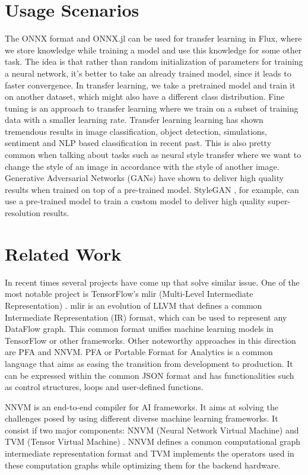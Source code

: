 \documentclass{juliacon}
\begin{document}
\section{Usage Scenarios}
The ONNX format and ONNX.jl can be used for transfer learning in Flux, where we store knowledge while training a model and
use this knowledge for some other task. The idea is that rather than random initialization of parameters for training a neural network, it's better to take an already trained model, since
it leads to faster convergence. In transfer learning, we take a pretrained model and train it on another 
dataset, which might also have a different class distribution. Fine tuning is an approach to transfer learning
where we train on a subset of training data with a smaller learning rate. Transfer learning learning has shown
tremendous results in image classification, object detection, simulations, sentiment and NLP based classification 
in recent past.    
This is also pretty common when talking about tasks such as neural style transfer where we want to change the 
style of an image in accordance with the style of another image. Generative Adversarial Networks (GANs) have shown
to deliver high quality results when trained on top of a pre-trained model. StyleGAN \cite{DBLP:journals/corr/abs-1812-04948} , for example, can use a
pre-trained model to train a custom model to deliver high quality super-resolution results.

\section{Related Work}

In recent times several projects have come up that solve similar issue. One of the most notable project is
TensorFlow's mlir (Multi-Level Intermediate Representation) \cite{lattner2020mlir} . mlir is an evolution of LLVM 
\cite{LLVM:CGO04} that defines a 
common Intermediate Representation (IR) format, which can be used to represent any DataFlow graph. This common 
format unifies machine learning models in TensorFlow or other frameworks.  
Other noteworthy approaches in this direction are PFA and NNVM. PFA \cite{10.1145/2939672.2939731} or Portable Format for Analytics is a common
language that aims as easing the transition from development to production. It can be expressed within
the common JSON format and has functionalities such as control structures, loops and user-defined functions.
  
NNVM\cite{nnvm} is an end-to-end compiler for AI frameworks. It aims at solving the challenges posed by using different
diverse machine learning frameworks. It consist if two major components: NNVM (Neural Network Virtual Machine)
and TVM (Tensor Virtual Machine) \cite{article} . NNVM defines a common computational graph intermediate representation
format and TVM implements the operators used in these computation graphs while optimizing them for the backend hardware.
\end{document}
